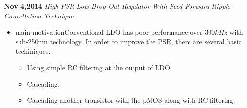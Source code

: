 \documentclass[]{article}
\begin{document}
\noindent \textbf{Nov 4,2014}
\textit{High PSR Low Drop-Out Regulator With Feed-Forward Ripple Cancellation
Technique}
\indent		\begin{itemize}
            \item {main motivation}Conventional LDO has poor performance over
            $300kHz$ with sub-250nm technology. In order to improve the PSR,
            there are several basic techiniques. 
                \begin{itemize}
                    \item Using simple RC filtering at the output of LDO.
                    \item Cascading.
                    \item Cascading another transistor with the pMOS along with
                    RC filtering.
                \end{itemize}
       		\end{itemize}
\end{document}
